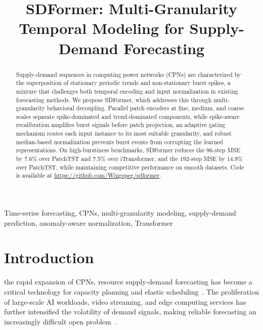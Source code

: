 \documentclass[journal]{IEEEtran}
\begin{document}

\title{SDFormer: Multi-Granularity Temporal Modeling for Supply-Demand Forecasting}


\maketitle

\begin{abstract}
Supply-demand sequences in computing power networks (CPNs) are characterized by
the superposition of stationary periodic trends and non-stationary burst
spikes, a mixture that challenges both temporal encoding and input
normalization in existing forecasting methods.
We propose SDFormer, which addresses this through multi-granularity
behavioral decoupling. Parallel patch encoders at fine, medium, and coarse
scales separate spike-dominated and trend-dominated components, while
spike-aware recalibration amplifies burst signals before patch projection,
an adaptive gating mechanism routes each input instance to its most suitable
granularity, and robust median-based normalization prevents burst events
from corrupting the learned representations.
On high-burstiness benchmarks, SDFormer reduces the 96-step MSE by 7.6\%
over PatchTST and 7.5\% over iTransformer, and the 192-step MSE by 14.9\%
over PatchTST, while maintaining competitive performance on smooth datasets.
Code is available at \url{https://github.com/Wingspeg/sdformer}.
\end{abstract}

\begin{IEEEkeywords}
Time-series forecasting, CPNs, multi-granularity
modeling, supply-demand prediction, anomaly-aware normalization, Transformer
\end{IEEEkeywords}

\section{Introduction}

 the rapid expansion of CPNs,
resource supply-demand forecasting has become a critical technology for
capacity planning and elastic scheduling~\cite{zhou2023survey}.
The proliferation of large-scale AI workloads, video streaming, and edge
computing services has further intensified the volatility of demand signals,
making reliable forecasting an increasingly difficult open problem~\cite{alieldin2014burstiness}.
\end{document}
